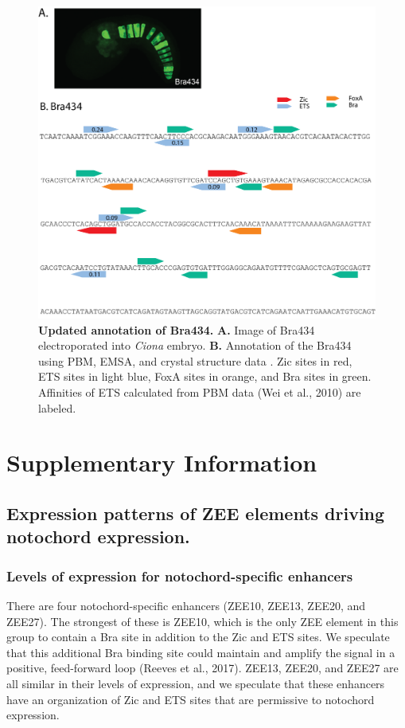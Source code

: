 \begin{figure}[p]
    \centering
    \includegraphics[scale=.65]{2_figures/FigS6_Bra434-Dissection.png}
    \caption[Updated annotation of Bra434]{\textbf{Updated annotation of Bra434.} \textbf{A.} Image of Bra434 electroporated into \textit{Ciona} embryo. \textbf{B.} Annotation of the Bra434 using PBM, EMSA, and crystal structure data . Zic sites in red, ETS sites in light blue, FoxA sites in orange, and Bra sites in green. Affinities of ETS calculated from PBM data (Wei et al., 2010) are labeled.}
    \label{fig:supplement bra434 annotated}
\end{figure}

\section{Supplementary Information}

\subsection{Expression patterns of ZEE elements driving notochord expression.}
\subsubsection{Levels of expression for notochord-specific enhancers}
There are four notochord-specific enhancers (ZEE10, ZEE13, ZEE20, and ZEE27). The strongest of these is ZEE10, which is the only ZEE element in this group to contain a Bra site in addition to the Zic and ETS sites. We speculate that this additional Bra binding site could maintain and amplify the signal in a positive, feed-forward loop (Reeves et al., 2017). ZEE13, ZEE20, and ZEE27 are all similar in their levels of expression, and we speculate that these enhancers have an organization of Zic and ETS sites that are permissive to notochord expression. 

